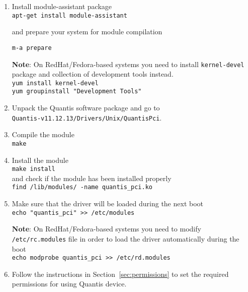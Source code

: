 \documentclass[a4paper,11pt]{article}
\providecommand{\note}[1]{\vspace{6pt}\noindent\textbf{Note}: #1\vspace{6pt}}
\newcommand{\QuantisDistVersion}{Quantis-v11.12.13}
\begin{document}
\begin{enumerate}
    \item Install module-assistant package\\
    \texttt{apt-get install module-assistant}

    and prepare your system for module compilation

    \texttt{m-a prepare}

    \note{On RedHat/Fedora-based systems you need to install
    \texttt{kernel-devel} package and collection of development tools
    instead.}\\ 
    \texttt{yum install kernel-devel} \\
    \texttt{yum groupinstall "Development Tools"}


    \item Unpack the Quantis software package and go to\\
    \texttt{\QuantisDistVersion /Drivers/Unix/QuantisPci}.

    \item Compile the module\\ \texttt{make}

    \item Install the module\\ \texttt{make install}\\ and check if the module
    has been installed properly\\ \texttt{find /lib/modules/ -name
    quantis\_pci.ko}

    \item Make sure that the driver will be loaded during the next boot \\
    \texttt{echo "quantis\_pci" >> /etc/modules}

    \note{On RedHat/Fedora-based systems you need to modify
    \texttt{/etc/rc.modules} file in order to load the driver automatically
    during the boot}\\ \texttt{echo modprobe quantis\_pci >> /etc/rd.modules}

    \item Follow the instructions in Section~\ref{sec:permissions} to set the
    required permissions for using Quantis device.

\end{enumerate}

\end{document}
